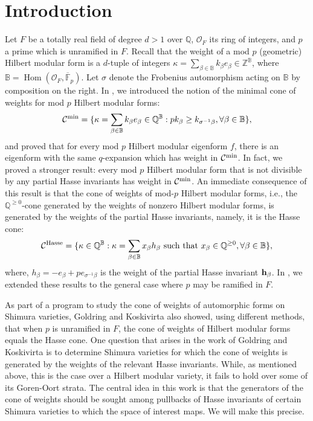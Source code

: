 \documentclass[11pt,pdflatex]{amsart}
\theoremstyle{plain}
\theoremstyle{definition}
\newcommand{\FF}{\mathbf{F}}
\newcommand{\QQ}{\mathbf{Q}}
\newcommand{\ZZ}{\mathbf{Z}}
\newcommand{\Fpbar}{{\overline{\FF}_p}}
\theoremstyle{plain}
\theoremstyle{definition}
\theoremstyle{remark}
\numberwithin{equation}{section}
\numberwithin{figure}{section} \numberwithin{table}{subsection}
\newcommand{\Hom}{{\operatorname{Hom}}}
\newcommand{\calC}{{\mathcal{C}}}
\newcommand{\calO}{{\mathcal{O}}}
\def\BB{\mathbb{B}}
\def\FF{\mathbb{F}}
\def\QQ{\mathbb{Q}}
\def\ZZ{\mathbb{Z}}
\begin{document}
\section{Introduction}
Let $F$ be a totally real field of degree $d>1$ over $\QQ$, $\calO_F$ its ring of integers, and $p$ a prime which is unramified in $F$. Recall that the weight of a mod $p$ (geometric) Hilbert modular form is a $d$-tuple of integers $\kappa=\sum_{\beta \in \BB} k_\beta e_\beta \in \ZZ^\BB$, where $\BB=\Hom(\calO_F,\Fpbar)$. Let $\sigma$ denote the Frobenius automorphism acting on $\BB$ by composition on the right. In \cite{DK1}, we introduced the notion of the minimal cone of weights for mod $p$ Hilbert modular forms:
\[
\calC^{\rm min}=\{\kappa=\sum_{\beta \in \BB} k_\beta e_\beta \in \QQ^\BB: pk_\beta \geq k_{\sigma^{-1}\beta}, \forall \beta \in \BB\},
\]
and proved that for every mod $p$ Hilbert modular eigenform $f$, there is an eigenform with the same $q$-expansion which has   weight in $\calC^{\rm min}$. In fact, we proved a stronger result:   every mod $p$ Hilbert modular form that is not divisible by any partial Hasse invariants has weight in  $\calC^{\rm min}$.  An immediate consequence of this result is that the cone of weights of mod-$p$ Hilbert modular forms, i.e., the $\QQ^{\geq 0}$-cone generated by the weights of nonzero Hilbert modular forms, is generated by the weights of the partial Hasse invariants, namely, it is the Hasse cone: 
\[
\calC^{\rm Hasse}=\{\kappa\in \QQ^\BB: \kappa= \sum_{\beta \in \BB} x_\beta h_\beta\ {\rm such\ that}\ x_\beta \in \QQ^{\geq0},  \forall \beta\in \BB\},
\]
where, $h_\beta =-e_\beta + p e_{\sigma^{-1}\beta}$ is the weight of the partial Hasse invariant ${\bf h}_\beta$. In \cite{DK2}, we extended these results to the general case where $p$ may be ramified in $F$. 

As part of a program to study the cone of weights of automorphic forms on Shimura varieties, Goldring and Koskivirta \cite{GK} also showed, using different methods,  that when $p$ is unramified in $F$, the cone of weights of Hilbert modular forms equals the Hasse cone. One question that arises in the work of Goldring and Koskivirta is to determine Shimura varieties for which the cone of weights is generated by the weights of the relevant Hasse invariants. While, as mentioned above, this is the case over a Hilbert modular variety, it fails to hold over some of its Goren-Oort strata. The central idea in this work is that the generators of the cone of weights should be sought among pullbacks of Hasse invariants of certain Shimura varieties to which the space of interest maps. We will make this precise. 
\end{document}
